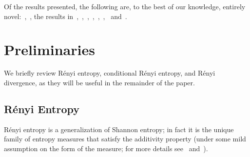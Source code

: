 \documentclass{article}
\numberwithin{theorem}{section}
\numberwithin{example}{section}
\numberwithin{remark}{section}
\numberwithin{definition}{section}
\begin{document}
Of the results presented, the following are, to the best of our knowledge, entirely novel:~,~, the results in~,~,~,~,~,~,~ and~.












\section{Preliminaries}\label{sec:prelim}



We briefly review R\'enyi entropy, conditional R\'enyi entropy, and R\'enyi divergence, as they will be useful in the remainder of the paper. 

\subsection{R\'enyi Entropy} \label{sec:renyi-entropy}

R\'enyi entropy is a generalization of Shannon entropy; in fact it is the unique family of entropy measures that satisfy the additivity property (under some mild assumption on the form of the measure; for more details see~\cite{renyi:61} and~\cite{daroczy:64}).
\end{document}
